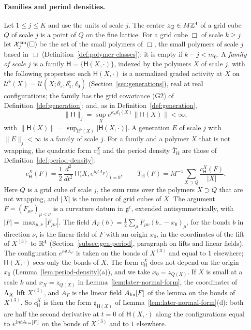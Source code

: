 \paragraph{Families and period densities.} Let $1\le j\le K$ and use the units of scale $j$. The centre $z_Q\in M\mathbb Z^4$ of a grid cube $Q$ of scale $j$ is a point of $Q$ on the fine lattice. For a grid cube $\Box$ of scale $k\ge j$ let $\mathcal X^{\rm sm}_j(\Box)$ be the set of the small polymers of $\Box$, the small polymers of scale $j$ based in $\Box$ (Definition~\ref{def:polymer-classes}); it is empty if $k-j<m_0$. A \emph{family of scale $j$} is a family $\mathsf H=\{\mathsf H(X,\cdot)\}$, indexed by the polymers $X$ of scale $j$, with the following properties: each $\mathsf H(X,\cdot)$ is a normalized graded activity at $X$ on $\mathcal U^\flat(X)=\mathcal U(X;\theta_r,\delta_1^\flat,\delta_0)$ (Section~\ref{sec:generations}), real at real configurations; the family has the grid covariance (G2) of Definition~\ref{def:generation}; and, as in Definition~\ref{def:generation},
\[
\|\mathsf H\|_j=\sup_Xe^{\kappa_nd_j(X)}\|\mathsf H(X)\|<\infty ,
\]
with $\|\mathsf H(X)\|=\sup_{\mathcal U^\flat(X)}|\mathsf H(X,\cdot)|$. A generation $E$ of scale $j$ with $\|E\|_j<\infty$ is a family of scale $j$. For a family and a polymer $X$ that is not wrapping, the quadratic form $c^X_{\mathsf H}$ and the period density $\bar T_{\mathsf H}$ are those of Definition~\ref{def:period-density}:
\[
c^X_{\mathsf H}(F)=\frac12\,\frac{d^2}{dt^2}\,\mathsf H\big(X,e^{\ii\eta tA_F}\big)\Big|_{t=0},\qquad\bar T_{\mathsf H}(F)=M^{-4}\sum_{X\supset Q}\frac{c^X_{\mathsf H}(F)}{|X|} .
\]
Here $Q$ is a grid cube of scale $j$, the sum runs over the polymers $X\supset Q$ that are not wrapping, and $|X|$ is the number of grid cubes of $X$. The argument $F=(F_{\mu\nu})_{\mu<\nu}$ is a curvature datum in $\mathfrak g^c$, extended antisymmetrically, with $|F|=\max_{\mu,\nu}|F_{\mu\nu}|$. The field $A_F(b)=\frac12\sum_\mu F_{\mu\nu}(b_--x_0)_\mu$, for the bonds $b$ in direction $\nu$, is the linear field of $F$ with an origin $x_0$, in the coordinates of the lift of $X^{(3)}$ to $\mathbb R^4$ (Section~\ref{subsec:gen-period}, paragraph on lifts and linear fields). The configuration $e^{\ii\eta tA_F}$ is taken on the bonds of $X^{(3)}$ and equal to $1$ elsewhere; $\mathsf H(X,\cdot)$ sees only the bonds of $X$. The form $c^X_{\mathsf H}$ does not depend on the origin $x_0$ (Lemma~\ref{lem:period-density}(a)), and we take $x_0=z_{Q(X)}$. If $X$ is small at a scale $k$ and $x_X=z_{Q(X)}$ in Lemma~\ref{lem:later-normal-form}, the coordinates of $\Lambda_X$ lift $X^{(3)}$, and $A_F$ is the linear field $A_{\rm lin}[F]$ of the lemma on the bonds of $X^{(3)}$. So $c^X_{\mathsf H}$ is then the form $\mathfrak q_{\mathsf H(X)}$ of Lemma~\ref{lem:later-normal-form}(d): both are half the second derivative at $t=0$ of $\mathsf H(X,\cdot)$ along the configurations equal to $e^{\mathrm i\eta tA_{\rm lin}[F]}$ on the bonds of $X^{(3)}$ and to $1$ elsewhere.

